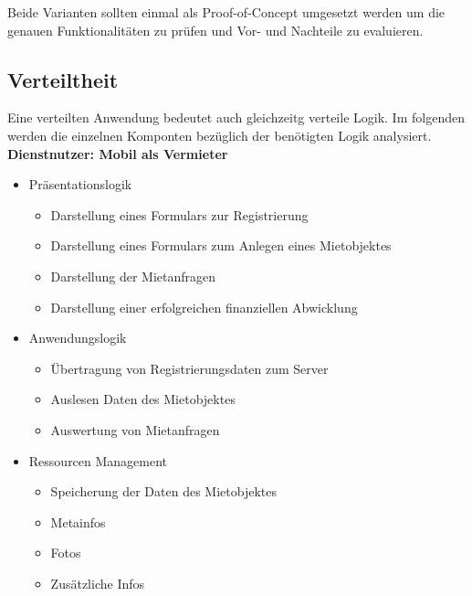 Beide Varianten sollten einmal als Proof-of-Concept umgesetzt werden um die genauen Funktionalitäten zu prüfen und Vor- und Nachteile zu evaluieren.

\subsection{Verteiltheit}

Eine verteilten Anwendung bedeutet auch gleichzeitg verteile Logik. Im folgenden werden die einzelnen Komponten bezüglich der benötigten Logik analysiert.\\

\textbf{Dienstnutzer: Mobil als Vermieter}
\begin{itemize}
	\item Präsentationslogik
	\begin{itemize}
  		\item Darstellung eines Formulars zur Registrierung
  		\item Darstellung eines Formulars zum Anlegen eines Mietobjektes
  		\item Darstellung der Mietanfragen
  		\item Darstellung einer erfolgreichen finanziellen Abwicklung
    \end{itemize}
	\item Anwendungslogik
	\begin{itemize}
  		\item Übertragung von Registrierungsdaten zum Server
  		\item Auslesen Daten des Mietobjektes
  		\item Auswertung von Mietanfragen
    \end{itemize}
	\item Ressourcen Management
	\begin{itemize}
  		\item Speicherung der Daten des Mietobjektes
		\item Metainfos
		\item Fotos
		\item Zusätzliche Infos
	\end{itemize}
\end{itemize}

